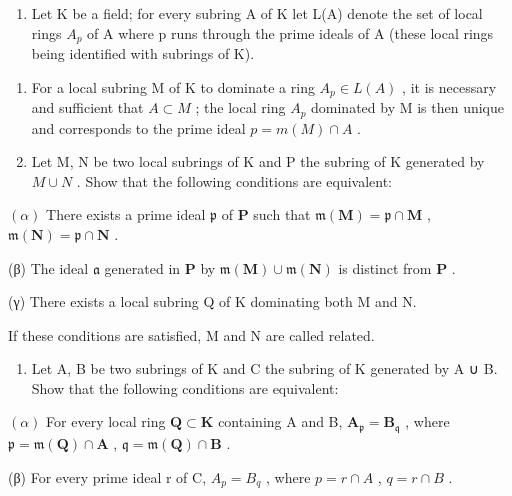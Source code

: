 
\begin{enumerate}
\def\labelenumi{\arabic{enumi}.}
\tightlist
\item
  Let K be a field; for every subring A of K let L(A) denote the set of local rings \(A_{p}\) of A where p runs through the prime ideals of A (these local rings being identified with subrings of K).
\end{enumerate}

\begin{enumerate}
\def\labelenumi{(\alph{enumi})}
\item
  For a local subring M of K to dominate a ring \(A_{p} \in L(A)\) , it is necessary and sufficient that \(A \subset M\) ; the local ring \(A_{p}\) dominated by M is then unique and corresponds to the prime ideal \(p = m(M) \cap A\) .
\item
  Let M, N be two local subrings of K and P the subring of K generated by \(M \cup N\) . Show that the following conditions are equivalent:
\end{enumerate}

\((\alpha)\) There exists a prime ideal \(\mathfrak{p}\) of \(\mathbf{P}\) such that \(\mathfrak{m}(\mathbf{M}) = \mathfrak{p} \cap \mathbf{M}\) , \(\mathfrak{m}(\mathbf{N}) = \mathfrak{p} \cap \mathbf{N}\) .

(β) The ideal \(\mathfrak{a}\) generated in \(\mathbf{P}\) by \(\mathfrak{m}(\mathbf{M}) \cup \mathfrak{m}(\mathbf{N})\) is distinct from \(\mathbf{P}\) .

(γ) There exists a local subring Q of K dominating both M and N.

If these conditions are satisfied, M and N are called related.

\begin{enumerate}
\def\labelenumi{(\alph{enumi})}
\setcounter{enumi}{2}
\tightlist
\item
  Let A, B be two subrings of K and C the subring of K generated by A ∪ B. Show that the following conditions are equivalent:
\end{enumerate}

\((\alpha)\) For every local ring \(\mathbf{Q} \subset \mathbf{K}\) containing A and B, \(\mathbf{A}_{\mathfrak{p}} = \mathbf{B}_{\mathfrak{q}}\) , where \(\mathfrak{p} = \mathfrak{m}(\mathbf{Q}) \cap \mathbf{A}\) , \(\mathfrak{q} = \mathfrak{m}(\mathbf{Q}) \cap \mathbf{B}\) .

(β) For every prime ideal r of C, \(A_{p} = B_{q}\) , where \(p = r \cap A\) , \(q = r \cap B\) .

